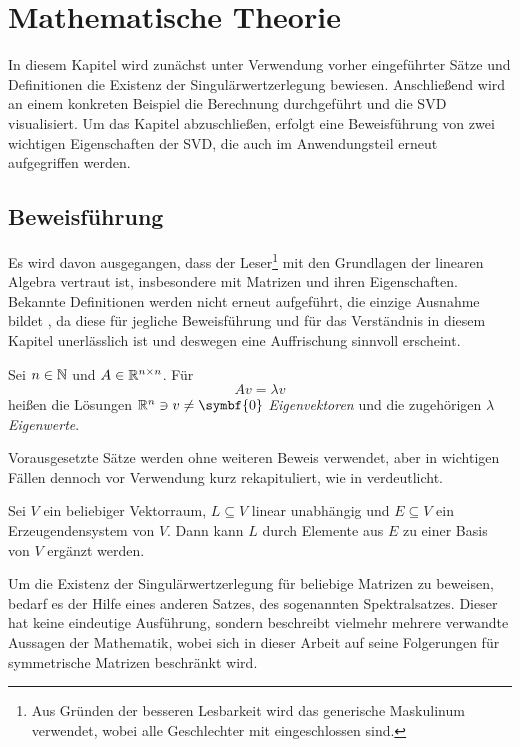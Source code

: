 \chapter{Mathematische Theorie}

In diesem Kapitel wird zunächst unter Verwendung vorher eingeführter Sätze und Definitionen die Existenz der Singulärwertzerlegung bewiesen.
Anschließend wird an einem konkreten Beispiel die Berechnung durchgeführt und die SVD visualisiert.
Um das Kapitel abzuschließen, erfolgt eine Beweisführung von zwei wichtigen Eigenschaften der SVD, die auch im Anwendungsteil erneut aufgegriffen werden.

\section{Beweisführung}
Es wird davon ausgegangen, dass der Leser\footnote{Aus Gründen der besseren Lesbarkeit wird das generische Maskulinum verwendet, wobei alle Geschlechter mit eingeschlossen sind.} mit den Grundlagen der linearen Algebra vertraut ist, insbesondere mit Matrizen und ihren Eigenschaften.
Bekannte Definitionen werden nicht erneut aufgeführt, die einzige Ausnahme bildet , da diese für jegliche Beweisführung und für das Verständnis in diesem Kapitel unerlässlich ist und deswegen eine Auffrischung sinnvoll erscheint.
\begin{definition}\label{eigvec}
    Sei \(n \in \mathbb{N}\) und \(A \in \mathbb{R}^{n \times n}\). Für
    \begin{equation*}
        Av=\lambda v
    \end{equation*}
    heißen die Lösungen \(\R^{n} \ni v \neq \symbf{0}\) \emph{Eigenvektoren} und die zugehörigen \(\lambda\) \emph{Eigenwerte}.   
\end{definition}
Vorausgesetzte Sätze werden ohne weiteren Beweis verwendet, aber in wichtigen Fällen dennoch vor Verwendung kurz rekapituliert, wie in  verdeutlicht.
\begin{repitition}[Basisergänzungssatz]\label{bes}
    Sei \(V\) ein beliebiger Vektorraum, \(L \subseteq V\) linear unabhängig und \(E \subseteq V\) ein Erzeugendensystem von \(V\). Dann kann \(L\) durch Elemente aus \(E\) zu einer Basis von \(V\) ergänzt werden.
\end{repitition}
Um die Existenz der Singulärwertzerlegung für beliebige Matrizen zu beweisen, bedarf es der Hilfe eines anderen Satzes, des sogenannten Spektralsatzes.
Dieser hat keine eindeutige Ausführung, sondern beschreibt vielmehr mehrere verwandte Aussagen der Mathematik, wobei sich in dieser Arbeit auf seine Folgerungen für symmetrische Matrizen beschränkt wird.
